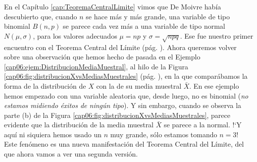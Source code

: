 En el Capítulo \ref{cap:TeoremaCentralLimite} vimos que De Moivre había
descubierto que, cuando $n$ se hace más y más grande, una variable de tipo
binomial $B(n,p)$ se parece cada vez más a una variable de tipo normal $N(\mu,
\sigma)$, para los valores adecuados $\mu=n p$ y $\sigma=\sqrt{npq}$. Ese fue
nuestro primer encuentro con el Teorema Central del Límite (pág.
\pageref{cap05:teo:TCL}). Ahora queremos volver sobre una observación que hemos
hecho de pasada en el Ejemplo \ref{cap06:ejem:DistribucionMediaMuestral}, al
hilo de la Figura \ref{cap06:fig:distribucionXvsMediasMuestrales} (pág.
\pageref{cap06:fig:distribucionXvsMediasMuestrales}), en la que comparábamos la
forma de la distribución de $X$ con la de su media muestral $\bar X$. En ese
ejemplo hemos empezado con una variable aleatoria que, desde luego, no es
binomial ({\em no estamos  midiendo éxitos de ningún tipo}). Y sin embargo,
cuando se observa la parte (b) de la Figura
\ref{cap06:fig:distribucionXvsMediasMuestrales}, parece evidente que la
distribución de la media muestral $\bar X$ se parece a la normal. {!`}Y aquí ni
siquiera hemos usado un $n$ muy grande, sólo estamos tomando $n=3$! Este
fenómeno es una nueva manifestación del Teorema Central del Límite, del que
ahora vamos a ver una segunda versión.

